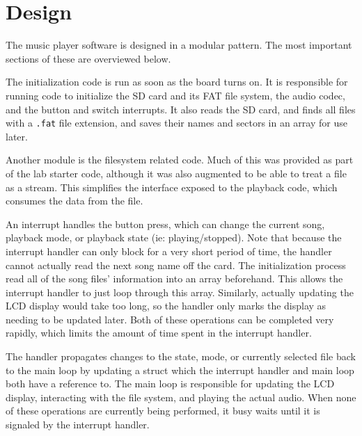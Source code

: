 \documentclass[12pt]{article}
\begin{document}
\doublespacing

\section{Design}

The music player software is designed in a modular pattern.
The most important sections of these are overviewed below.

The initialization code is run as soon as the board turns on.
It is responsible for running code to initialize the SD card and its FAT file
system, the audio codec, and the button and switch interrupts.
It also reads the SD card, and finds all files with a \texttt{.fat} file
extension, and saves their names and sectors in an array for use later.

Another module is the filesystem related code.
Much of this was provided as part of the lab starter code, although it was also
augmented to be able to treat a file as a stream.
This simplifies the interface exposed to the playback code, which consumes the
data from the file.

An interrupt handles the button press, which can change the current song,
playback mode, or playback state (ie: playing/stopped).
Note that because the interrupt handler can only block for a very short period
of time, the handler cannot actually read the next song name off the card.
The initialization process read all of the song files' information into an
array beforehand.
This allows the interrupt handler to just loop through this array.
Similarly, actually updating the LCD display would take too long, so the
handler only marks the display as needing to be updated later.
Both of these operations can be completed very rapidly, which limits the amount
of time spent in the interrupt handler.

The handler propagates changes to the state, mode, or currently selected file
back to the main loop by updating a struct which the interrupt handler and main
loop both have a reference to.
The main loop is responsible for updating the LCD display, interacting with
the file system, and playing the actual audio.
When none of these operations are currently being performed,
it busy waits until it is signaled by the interrupt handler.
\end{document}
